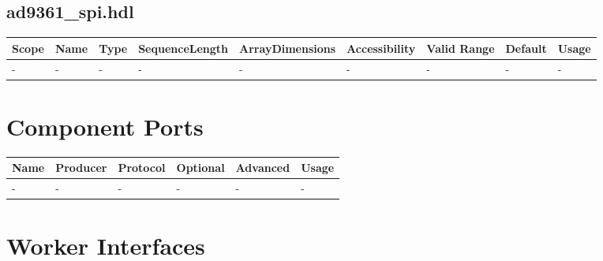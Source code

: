 \documentclass{article}
\def\comp{ad9361\_spi}
\begin{document}
\begin{landscape}
	\subsection*{\comp.hdl}
	\begin{scriptsize}
		\begin{tabular}{|p{2cm}|p{2cm}|p{1cm}|p{2cm}|p{2cm}|p{2cm}|p{2cm}|p{1cm}|p{4.58cm}|}
			\hline
			\rowcolor{blue}
			Scope        & Name                 & Type & SequenceLength & ArrayDimensions & Accessibility & Valid Range        & Default & Usage                                                                                                                  \\
			\hline
			- & - & - & - & - & - & - & - & - \\
			\hline
		\end{tabular}
	\end{scriptsize}

	\section*{Component Ports}
	\begin{scriptsize}
		\begin{tabular}{|p{2cm}|p{1.5cm}|p{4cm}|p{1.5cm}|p{1.5cm}|p{9.38cm}|}
			\hline
			\rowcolor{blue}
			Name & Producer & Protocol           & Optional & Advanced & Usage                  \\
			\hline
			-  & -     & - & -     & -        & - \\
			\hline
		\end{tabular}
	\end{scriptsize}
	\section*{Worker Interfaces}

\end{landscape}
\end{document}
